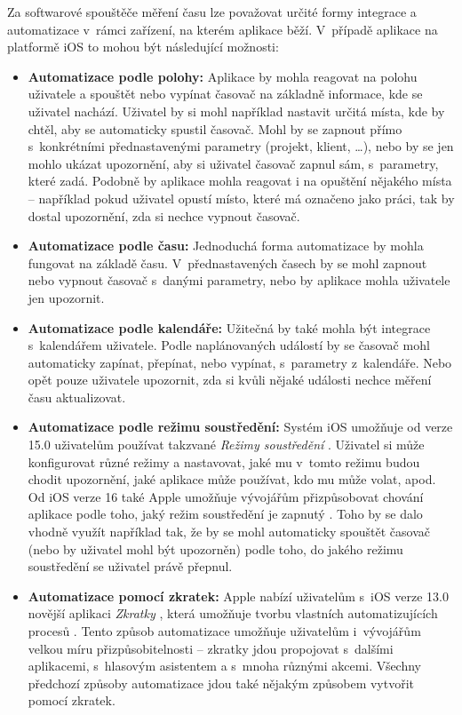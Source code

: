 Za softwarové spouštěče měření času lze považovat určité formy integrace a automatizace v~rámci zařízení, na kterém aplikace běží. V~případě aplikace na platformě iOS to mohou být následující možnosti:
\begin{itemize}
\item\textbf{Automatizace podle polohy:} Aplikace by mohla reagovat na polohu uživatele a spouštět nebo vypínat časovač na základně informace, kde se uživatel nachází. Uživatel by si mohl například nastavit určitá místa, kde by chtěl, aby se automaticky spustil časovač. Mohl by se zapnout přímo s~konkrétními přednastavenými parametry (projekt, klient, \dots), nebo by se jen mohlo ukázat upozornění, aby si uživatel časovač zapnul sám, s~parametry, které zadá. Podobně by aplikace mohla reagovat i na opuštění nějakého místa – například pokud uživatel opustí místo, které má označeno jako práci, tak by dostal upozornění, zda si nechce vypnout časovač.
\item\textbf{Automatizace podle času:} Jednoduchá forma automatizace by mohla fungovat na základě času. V~přednastavených časech by se mohl zapnout nebo vypnout časovač s~danými parametry, nebo by aplikace mohla uživatele jen upozornit.
\item\textbf{Automatizace podle kalendáře:} Užitečná by také mohla být integrace s~kalendářem uživatele. Podle naplánovaných událostí by se časovač mohl automaticky zapínat, přepínat, nebo vypínat, s~parametry z~kalendáře. Nebo opět pouze uživatele upozornit, zda si kvůli nějaké události nechce měření času aktualizovat.
\item\textbf{Automatizace podle režimu soustředění:} Systém iOS umožňuje od verze 15.0 uživatelům používat takzvané \emph{Režimy soustředění} \cite{ios-focus-modes}. Uživatel si může konfigurovat různé režimy a nastavovat, jaké mu v~tomto režimu budou chodit upozornění, jaké aplikace může používat, kdo mu může volat, apod. Od iOS verze 16 také Apple umožňuje vývojářům přizpůsobovat chování aplikace podle toho, jaký režim soustředění je zapnutý \cite{ios-focus-modes-adjustment}. Toho by se dalo vhodně využít například tak, že by se mohl automaticky spouštět časovač (nebo by uživatel mohl být upozorněn) podle toho, do jakého režimu soustředění se uživatel právě přepnul.
\item\textbf{Automatizace pomocí zkratek:} Apple nabízí uživatelům s~iOS verze 13.0 novější aplikaci \emph{Zkratky} \cite{ios-shortcuts-app}, která umožňuje tvorbu vlastních automatizujících procesů \cite{ios-shortcuts}. Tento způsob automatizace umožňuje uživatelům i~vývojářům velkou míru přizpůsobitelnosti – zkratky jdou propojovat s~dalšími aplikacemi, s~hlasovým asistentem a s~mnoha různými akcemi. Všechny předchozí způsoby automatizace jdou také nějakým způsobem vytvořit pomocí zkratek. \cite{ios-shortcuts-developer}
\end{itemize}

